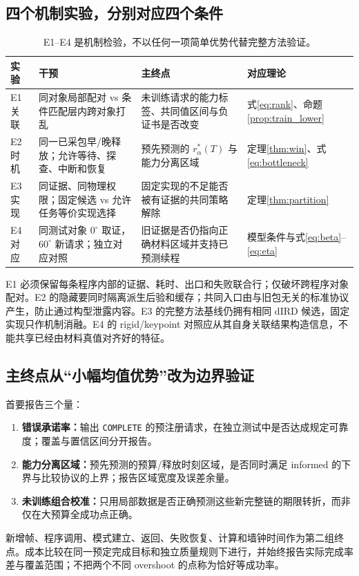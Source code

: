 \documentclass[11pt,a4paper,fontset=fandol]{ctexart}
\theoremstyle{definition}
\theoremstyle{remark}\newtheorem{remark}[theorem]{说明}
\numberwithin{equation}{section}
\begin{document}
\subsection{四个机制实验，分别对应四个条件}
\begin{table}[htbp]\centering\small
\begin{tabularx}{\linewidth}{P{.13\linewidth}P{.30\linewidth}YY}\toprule
实验 & 干预 & 主终点 & 对应理论\\\midrule
E1 关联 & 同对象局部配对 vs 条件匹配层内跨对象打乱 & 未训练请求的能力标签、共同值区间与负证书是否改变 & 式\eqref{eq:rank}、命题\ref{prop:train_lower}\\
E2 时机 & 同一已采包早/晚释放；允许等待、探查、中断和恢复 & 预先预测的 $r_\alpha^*(T)$ 与能力分离区域 & 定理\ref{thm:win}、式\eqref{eq:bottleneck}\\
E3 实现 & 同证据、同物理权限；固定候选 vs 允许任务等价实现选择 & 固定实现的不足能否被有证据的共同策略解除 & 定理\ref{thm:partition}\\
E4 对应 & 同测试对象 $0^\circ$ 取证，$60^\circ$ 新请求；独立对应对照 & 旧证据是否仍指向正确材料区域并支持已预测续程 & 模型条件与式\eqref{eq:beta}--\eqref{eq:eta}\\\bottomrule
\end{tabularx}
\caption{E1--E4 是机制检验，不以任何一项简单优势代替完整方法验证。}
\end{table}

E1 必须保留每条程序内部的证据、耗时、出口和失败联合行；仅破坏跨程序对象配对。E2 的隐藏要同时隔离派生后验和缓存；共同入口由与旧包无关的标准协议产生，防止通过构型泄露内容。E3 的完整方法基线仍拥有相同 dIRD 候选，固定实现只作机制消融。E4 的 rigid/keypoint 对照应从其自身关联结果构造信息，不能共享已经由材料真值对齐好的特征。

\subsection{主终点从“小幅均值优势”改为边界验证}
首要报告三个量：
\begin{enumerate}
\item \textbf{错误承诺率：}输出 \texttt{COMPLETE} 的预注册请求，在独立测试中是否达成规定可靠度；覆盖与置信区间分开报告。
\item \textbf{能力分离区域：}预先预测的预算/释放时刻区域，是否同时满足 informed 的下界与比较协议的上界；报告区域宽度及误差余量。
\item \textbf{未训练组合校准：}只用局部数据是否正确预测这些新完整链的期限转折，而非仅在大预算全成功点正确。
\end{enumerate}
新增帧、程序调用、模式建立、返回、失败恢复、计算和墙钟时间作为第二组终点。成本比较在同一预定完成目标和独立质量规则下进行，并始终报告实际完成率差与覆盖范围；不把两个不同 overshoot 的点称为恰好等成功率。
\end{document}
